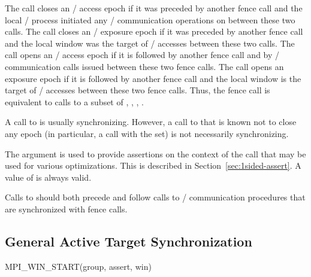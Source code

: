 The call closes an \RMA/ access epoch if it was preceded by
another fence call and the local \mpi/ process initiated any \RMA/ communication
operations on  between these two calls.  The call
closes an \RMA/ exposure epoch if it was
preceded by another fence call and the local window was the target of \RMA/
accesses between these two calls.  The call opens an
\RMA/ access epoch if it is followed by another fence call and by
\RMA/ communication calls issued between these two fence calls.  The
call opens an exposure epoch if it is followed by another fence call
and the local window is the target of \RMA/ accesses between these two fence calls.
Thus, the fence call is equivalent to calls to a subset of
, , , .

A call to  is usually synchronizing.
However, a call to 
that is known not to close any epoch
(in particular, a call with the   set) is
not necessarily synchronizing.

The  argument is used to provide assertions on the
context of the call that may be used for various optimizations.  This
is described in
Section~\ref{sec:1sided-assert}.  A value of  is
always valid.

\begin{users}
Calls to  should both precede and follow calls to
\RMA/ communication procedures that are synchronized with fence calls.
\end{users}

\subsection{General Active Target Synchronization}
\label{sec:1sided-pscw}
\label{sec:1sided-sync:pscw}

%
%
\begin{funcdef}{MPI\_WIN\_START}{(\mbox{group}, \mbox{assert}, \mbox{win})}
\end{funcdef}

